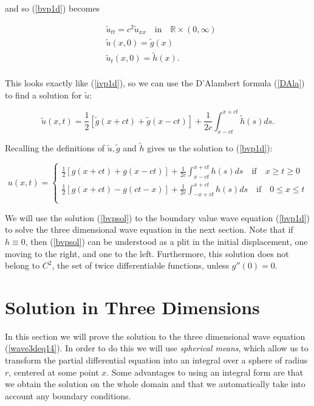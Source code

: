 \documentclass[a4paper, 12pt]{article}
\numberwithin{equation}{section}
\begin{document}
and so (\ref{bvp1d}) becomes 

\begin{equation*}
    \begin{aligned}
        &\tilde{u}_{tt}=c^2\tilde{u}_{xx} \quad \textrm{in} \quad \mathbb{R}\times(0,\infty)\\
        &\tilde{u}(x,0)=\tilde{g}(x)\\
        &\tilde{u}_t(x,0)=\tilde{h}(x).\\
    \end{aligned}
\end{equation*}

This looks exactly like (\ref{ivp1d}), so we can use the D'Alambert formula (\ref{DAla}) to find a solution for $\tilde{u}$:

\begin{equation*}
    \tilde{u}(x,t)=\frac{1}{2}\left[\tilde{g}(x+ct)+\tilde{g}(x-ct)\right]+\frac{1}{2c}\int^{x+ct}_{x-ct}\tilde{h}(s)ds.
\end{equation*}

Recalling the definitions of $\tilde{u}, \tilde{g}$ and $\tilde{h}$ gives us the solution to (\ref{bvp1d}):

\begin{equation} \label{bvpsol}
    u(x,t)=
    \begin{cases}
        \frac{1}{2}\left[g(x+ct)+g(x-ct)\right]+\frac{1}{2c}\int^{x+ct}_{x-ct}h(s)ds \quad \textrm{if} \quad x \ge t \ge 0\\
        \frac{1}{2}\left[g(x+ct)-g(ct-x)\right]+\frac{1}{2c}\int^{x+ct}_{-x+ct}h(s)ds \quad \textrm{if} \quad 0 \le x \le t\\
    \end{cases}
\end{equation}

We will use the solution (\ref{bvpsol}) to the boundary value wave equation (\ref{bvp1d}) to solve the three dimensional wave equation in 
the next section. Note that if $h \equiv 0$, then (\ref{bvpsol}) can be understood as a plit in the initial displacement, one moving
to the right, and one to the left. \cite{Ev} Furthermore, this solution does not belong to $C^2$, the set of twice differentiable functions, 
unless $g''(0)=0$.

\section{Solution in Three Dimensions}
In this section we will prove the solution to the three dimensional wave equation (\ref{wave3deq14}). In order to do this we will use \emph{spherical
means}, which allow us to transform the partial differential equation into an integral over a sphere of radius $r$, centered at some point $x$. 
Some advantages to using an integral form are that we obtain the solution on the whole domain and that we automatically take into account any
boundary conditions. \cite{Sab} 
\\
\end{document}

